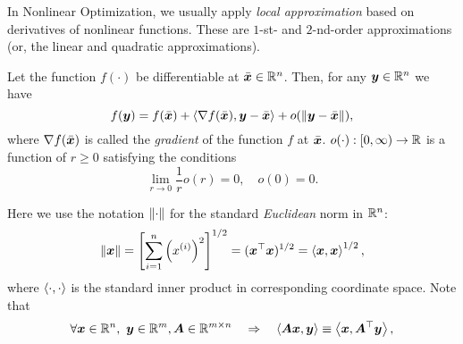In Nonlinear Optimization, we usually apply \emph{local approximation} based on derivatives of nonlinear functions. These are \(1\)-st- and \(2\)-nd-order approximations (or, the linear and quadratic approximations).

\begin{defn}\label{defn:linear_approx}
    Let the function \(f(\cdot)\) be differentiable at \(\bar{\bm{x}} \in \mathbb{R}^n\). Then, for any \(\bm{y} \in \mathbb{R}^n\) we have
    \[
        f(\bm{y}) = f(\bar{\bm{x}}) + \left\langle \nabla f(\bar{\bm{x}}), \bm{y} - \bar{\bm{x}} \right\rangle + o(\norm{\bm{y} - \bar{\bm{x}}}),
    \]
    where \(\nabla f(\bar{\bm{x}})\) is called the \emph{gradient} of the function \(f\) at \(\bar{\bm{x}}\). \(o(\cdot): [0, \infty) \to \mathbb{R}\) is a function of \(r \ge 0\) satisfying the conditions
    \[
        \lim_{r\to0} \frac{1}{r} o(r) = 0, \quad o(0) = 0. 
    \]
\end{defn}

Here we use the notation \(\norm{\cdot}\) for the standard \emph{Euclidean} norm in \(\mathbb{R}^n\):
\[
    \norm{\bm{x}} = \left[ \sum_{i=1}^n \left( x^{(i)} \right)^2 \right]^{1/2} = (\bm{x}^\top \bm{x})^{1/2} = \left\langle \bm{x}, \bm{x} \right\rangle^{1/2},
\]
where \(\left\langle \cdot, \cdot \right\rangle\) is the standard inner product in corresponding coordinate space. Note that
\[
    \forall \bm{x} \in \mathbb{R}^n,~\bm{y} \in \mathbb{R}^m, \bm{A} \in \mathbb{R}^{m \times n} \quad \Rightarrow \quad \left\langle \bm{A}\bm{x}, \bm{y} \right\rangle \equiv \left\langle \bm{x}, \bm{A}^\top\bm{y} \right\rangle,
\] 

